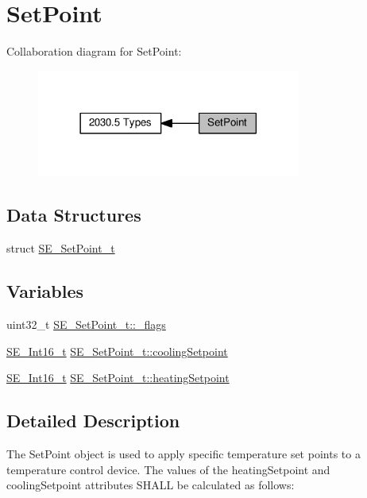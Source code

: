 \hypertarget{group__SetPoint}{}\section{Set\+Point}
\label{group__SetPoint}
Collaboration diagram for Set\+Point\+:\nopagebreak
\begin{figure}[H]
\begin{center}
\leavevmode
\includegraphics[width=246pt]{group__SetPoint}
\end{center}
\end{figure}
\subsection*{Data Structures}
\begin{DoxyCompactItemize}
\item 
struct \hyperlink{structSE__SetPoint__t}{S\+E\+\_\+\+Set\+Point\+\_\+t}
\end{DoxyCompactItemize}
\subsection*{Variables}
\begin{DoxyCompactItemize}
\item 
uint32\+\_\+t \hyperlink{group__SetPoint_ga360f6a67726d6468bd638a32b65a0a1d}{S\+E\+\_\+\+Set\+Point\+\_\+t\+::\+\_\+flags}
\item 
\hyperlink{group__Int16_ga0d600c7df811a7d4b4816e8965877690}{S\+E\+\_\+\+Int16\+\_\+t} \hyperlink{group__SetPoint_gadc4572d576c1de2dd7de8357024e4029}{S\+E\+\_\+\+Set\+Point\+\_\+t\+::cooling\+Setpoint}
\item 
\hyperlink{group__Int16_ga0d600c7df811a7d4b4816e8965877690}{S\+E\+\_\+\+Int16\+\_\+t} \hyperlink{group__SetPoint_ga961578027f149085d46eb9fd1ddb4956}{S\+E\+\_\+\+Set\+Point\+\_\+t\+::heating\+Setpoint}
\end{DoxyCompactItemize}


\subsection{Detailed Description}
The Set\+Point object is used to apply specific temperature set points to a temperature control device. The values of the heating\+Setpoint and cooling\+Setpoint attributes S\+H\+A\+LL be calculated as follows\+:

